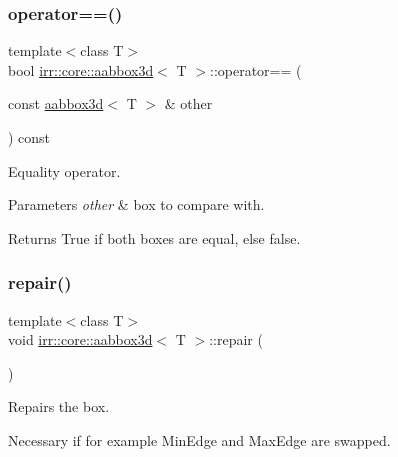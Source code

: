 \subsubsection{\texorpdfstring{operator==()}{operator==()}}
{\footnotesize\ttfamily template$<$class T$>$ \\
bool \hyperlink{classirr_1_1core_1_1aabbox3d}{irr\+::core\+::aabbox3d}$<$ T $>$\+::operator== (\begin{DoxyParamCaption}\item[{const \hyperlink{classirr_1_1core_1_1aabbox3d}{aabbox3d}$<$ T $>$ \&}]{other }\end{DoxyParamCaption}) const\hspace{0.3cm}{\ttfamily [inline]}}



Equality operator. 


\begin{DoxyParams}{Parameters}
{\em other} & box to compare with. \\
\hline
\end{DoxyParams}
\begin{DoxyReturn}{Returns}
True if both boxes are equal, else false. 
\end{DoxyReturn}
\mbox{\label{classirr_1_1core_1_1aabbox3d_a904b14e6b6a99187820a7407b5d7cf23}} 
\subsubsection{\texorpdfstring{repair()}{repair()}}
{\footnotesize\ttfamily template$<$class T$>$ \\
void \hyperlink{classirr_1_1core_1_1aabbox3d}{irr\+::core\+::aabbox3d}$<$ T $>$\+::repair (\begin{DoxyParamCaption}{ }\end{DoxyParamCaption})\hspace{0.3cm}{\ttfamily [inline]}}



Repairs the box. 

Necessary if for example Min\+Edge and Max\+Edge are swapped. \mbox{\label{classirr_1_1core_1_1aabbox3d_afc718e96ed11aa71a30311d32bfc885a}} 
